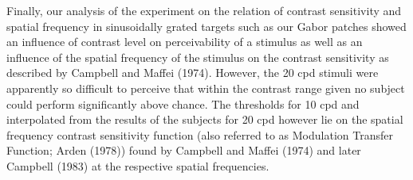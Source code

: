 \newline
 \newline
 Finally, our analysis of the experiment on the relation of contrast sensitivity and spatial frequency in sinusoidally grated targets such as our Gabor patches showed an influence of contrast level on perceivability of a stimulus as well as an influence of the spatial frequency of the stimulus on the contrast sensitivity as described by Campbell and Maffei (1974). However, the 20 cpd stimuli were apparently so difficult to perceive that within the contrast range given no subject could perform significantly above chance. The thresholds for 10 cpd and interpolated from the results of the subjects for 20 cpd however lie on the  spatial frequency contrast
sensitivity function (also referred to as Modulation Transfer Function; Arden (1978)) found by Campbell and Maffei (1974) and later Campbell (1983) at the respective spatial frequencies.
